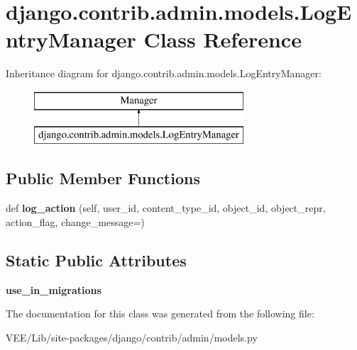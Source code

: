\hypertarget{classdjango_1_1contrib_1_1admin_1_1models_1_1_log_entry_manager}{}\section{django.\+contrib.\+admin.\+models.\+Log\+Entry\+Manager Class Reference}
\label{classdjango_1_1contrib_1_1admin_1_1models_1_1_log_entry_manager}
Inheritance diagram for django.\+contrib.\+admin.\+models.\+Log\+Entry\+Manager\+:\begin{figure}[H]
\begin{center}
\leavevmode
\includegraphics[height=2.000000cm]{classdjango_1_1contrib_1_1admin_1_1models_1_1_log_entry_manager}
\end{center}
\end{figure}
\subsection*{Public Member Functions}
\begin{DoxyCompactItemize}
\item 
\mbox{\label{classdjango_1_1contrib_1_1admin_1_1models_1_1_log_entry_manager_aa81ed392c74aa13dcea6c62271bedf5d}} 
def {\bfseries log\+\_\+action} (self, user\+\_\+id, content\+\_\+type\+\_\+id, object\+\_\+id, object\+\_\+repr, action\+\_\+flag, change\+\_\+message=\textquotesingle{}\textquotesingle{})
\end{DoxyCompactItemize}
\subsection*{Static Public Attributes}
\begin{DoxyCompactItemize}
\item 
\mbox{\label{classdjango_1_1contrib_1_1admin_1_1models_1_1_log_entry_manager_ab6fe7d5b4f599008efac9b50018a6c3d}} 
{\bfseries use\+\_\+in\+\_\+migrations}
\end{DoxyCompactItemize}


The documentation for this class was generated from the following file\+:\begin{DoxyCompactItemize}
\item 
V\+E\+E/\+Lib/site-\/packages/django/contrib/admin/models.\+py\end{DoxyCompactItemize}
